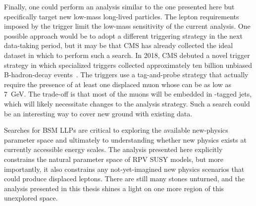 Finally, one could perform an analysis similar to the one presented here but specifically target new low-mass long-lived particles. The lepton \pt requirements imposed by the trigger limit the low-mass sensitivity of the current analysis. One possible approach would be to adopt a different triggering strategy in the next data-taking period, but it may be that CMS has already collected the ideal dataset in which to perform such a search. In 2018, CMS debuted a novel trigger strategy in which specialized triggers collected approximately ten billion unbiased B-hadron-decay events~\cite{cms_b_parking}. The triggers use a tag-and-probe strategy that actually require the presence of at least one displaced muon whose \pt can be as low as \SI{7}{\GeV}. The trade-off is that most of the muons will be embedded in \cPqb-tagged jets, which will likely necessitate changes to the analysis strategy. Such a search could be an interesting way to cover new ground with existing data.

Searches for BSM LLPs are critical to exploring the available new-physics parameter space and ultimately to understanding whether new physics exists at currently accessible energy scales. The analysis presented here explicitly constrains the natural parameter space of RPV SUSY models, but more importantly, it also constrains any not-yet-imagined new physics scenarios that could produce displaced leptons. There are still many stones unturned, and the analysis presented in this thesis shines a light on one more region of this unexplored space.

\pagebreak